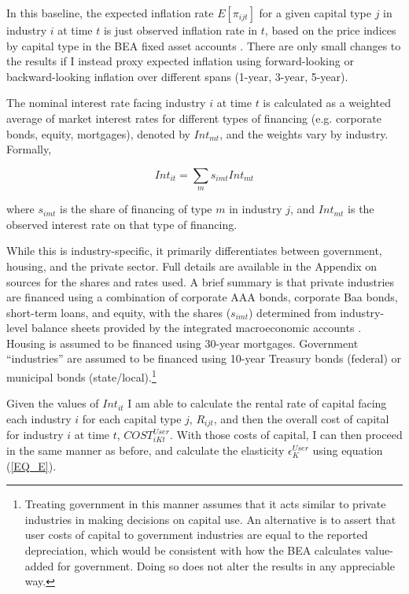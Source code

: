 \documentclass[11pt]{article}
\begin{document}
In this baseline, the expected inflation rate $E[\pi_{ijt}]$ for a given capital type $j$ in industry $i$ at time $t$ is just observed inflation rate in $t$, based on the price indices by capital type in the BEA fixed asset accounts \citep{beacap,beagov}. There are only small changes to the results if I instead proxy expected inflation using forward-looking or backward-looking inflation over different spans (1-year, 3-year, 5-year).

The nominal interest rate facing industry $i$ at time $t$ is calculated as a weighted average of market interest rates for different types of financing (e.g. corporate bonds, equity, mortgages), denoted by $Int_{mt}$, and the weights vary by industry. Formally,

\begin{equation}
    Int_{it} = \sum_m s_{imt} Int_{mt}
\end{equation} 

where $s_{imt}$ is the share of financing of type $m$ in industry $j$, and $Int_{mt}$ is the observed interest rate on that type of financing. 

While this is industry-specific, it primarily differentiates between government, housing, and the private sector. Full details are available in the Appendix on sources for the shares and rates used. A brief summary is that private industries are financed using a combination of corporate AAA bonds, corporate Baa bonds, short-term loans, and equity, with the shares ($s_{imt}$) determined from industry-level balance sheets provided by the integrated macroeconomic accounts \citep{beaimap}. Housing is assumed to be financed using 30-year mortgages. Government ``industries'' are assumed to be financed using 10-year Treasury bonds (federal) or municipal bonds (state/local).\footnote{Treating government in this manner assumes that it acts similar to private industries in making decisions on capital use. An alternative is to assert that user costs of capital to government industries are equal to the reported depreciation, which would be consistent with how the BEA calculates value-added for government. Doing so does not alter the results in any appreciable way.}

Given the values of $Int_{it}$ I am able to calculate the rental rate of capital facing each industry $i$ for each capital type $j$, $R_{ijt}$, and then the overall cost of capital for industry $i$ at time $t$, $COST^{User}_{iKt}$. With those costs of capital, I can then proceed in the same manner as before, and calculate the elasticity $\epsilon_K^{User}$ using equation (\ref{EQ_E}).
\end{document}
